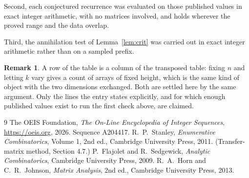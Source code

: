 \documentclass[11pt,a4paper]{article}
\theoremstyle{plain}
\theoremstyle{definition}
\newtheorem{remark}[theorem]{Remark}
\begin{document}
Second, each conjectured recurrence was evaluated on those published values in exact
integer arithmetic, with no matrices involved, and holds wherever the proved range and the
data overlap.

Third, the annihilation test of Lemma~\ref{lem:crit} was carried out in exact integer
arithmetic rather than on a sampled prefix.

\begin{remark}
A row of the table is a column of the transposed table: fixing $n$ and letting $k$ vary gives a
count of arrays of fixed height, which is the same kind of object with the two dimensions
exchanged. Both are settled here by the same argument. Only the lines the entry states
explicitly, and for which enough published values exist to run the first check above, are
claimed.
\end{remark}

\begin{thebibliography}{9}
 The OEIS Foundation, \emph{The On-Line Encyclopedia of Integer
Sequences}, \url{https://oeis.org}, 2026. Sequence A204417.
 R.~P.~Stanley, \emph{Enumerative Combinatorics}, Volume 1, 2nd ed.,
Cambridge University Press, 2011. (Transfer-matrix method, Section 4.7.)
 P.~Flajolet and R.~Sedgewick, \emph{Analytic Combinatorics}, Cambridge
University Press, 2009.
 R.~A.~Horn and C.~R.~Johnson, \emph{Matrix Analysis}, 2nd ed., Cambridge
University Press, 2013.
\end{thebibliography}
\end{document}
